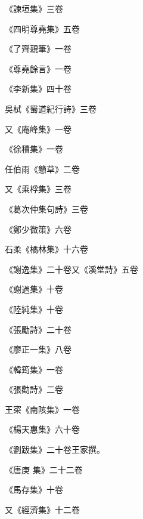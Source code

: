 \begin{pinyinscope}
 《諫垣集》三卷



 《四明尊堯集》五卷



 《了齊親筆》一卷



 《尊堯餘言》一卷



 《李新集》四十卷



 吳栻《蜀道紀行詩》三卷



 又《庵峰集》一卷



 《徐積集》一卷



 任伯雨《戇草》二卷



 又《乘桴集》三卷



 《葛次仲集句詩》三卷



 《鄭少微策》六卷



 石柔《橘林集》十六卷



 《謝逸集》二十卷又《溪堂詩》五卷



 《謝過集》十卷



 《陸純集》十卷



 《張勵詩》二十卷



 《廖正一集》八卷



 《韓筠集》一卷



 《張勸詩》二卷



 王寀《南陔集》一卷



 《楊天惠集》六十卷



 《劉跋集》二十卷王家撰。



 《唐庚
 集》二十二卷



 《馬存集》十卷



 又《經濟集》十二卷




\end{pinyinscope}
